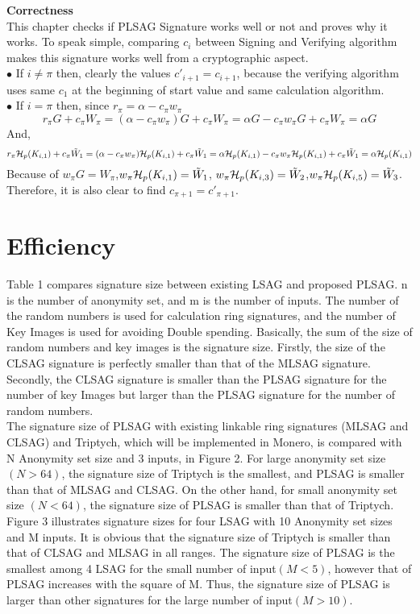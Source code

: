     \textbf{Correctness}\\
    This chapter checks if PLSAG Signature works well or not and proves why it works. To speak simple, comparing $c_{i}$ between Signing and Verifying algorithm makes this signature works well from a cryptographic aspect.\\
    $\bullet$ If $i\neq \pi $ then, clearly the values $c'_{i+1}=c_{i+1}$, 
    because the verifying algorithm uses same $c_{1}$ at the beginning of start value and same calculation algorithm.\\
    $\bullet$ If $i=\pi$ then, since $r_{\pi}=\alpha - c_{\pi}w_{\pi}$\\
    $$r_{\pi}G+c_{\pi}W_{\pi}=(\alpha - c_{\pi}w_{\pi})G+ c_{\pi}W_{\pi}=\alpha G - c_{\pi}w_{\pi}G + c_{\pi}W_{\pi}=\alpha G$$
    And,
    $$r_{\pi}{\cal H}_{p}(K_{i,1})+c_{\pi} \tilde{W}_{1}= (\alpha - c_{\pi}w_{\pi}){\cal H}_{p}(K_{i,1})+c_{\pi} \tilde{W}_{1}= \alpha {\cal H}_{p}(K_{i,1}) - c_{\pi}w_{\pi}{\cal H}_{p}(K_{i,1})+c_{\pi} \tilde{W}_{1}= \alpha {\cal H}_{p}(K_{i,1})$$
    Because of $w_{\pi}G=W_{\pi}$,$w_{\pi}{\cal H}_{p}(K_{i,1})=\tilde{W}_{1}$, $w_{\pi}{\cal H}_{p}(K_{i,3})=\tilde{W}_{2}$,$w_{\pi}{\cal H}_{p}(K_{i,5})=\tilde{W}_{3}$.\\
    Therefore, it is also clear to find $c_{\pi + 1}=c'_{\pi +1}$.

\section{Efficiency}

    Table 1 compares signature size between existing LSAG and proposed PLSAG. n is the number of anonymity set, and m is the number of inputs. The number of the random numbers is used for calculation ring signatures, and the number of Key Images is used for avoiding Double spending. Basically, the sum of the size of random numbers and key images is the signature size. Firstly, the size of the CLSAG signature is perfectly smaller than that of the MLSAG signature. Secondly, the CLSAG signature is smaller than the PLSAG signature for the number of key Images but larger than the PLSAG signature for the number of random numbers.\\ The signature size of PLSAG with existing linkable ring signatures (MLSAG and CLSAG) and Triptych, which will be implemented in Monero, is compared with N Anonymity set size and 3 inputs, in Figure 2. For large anonymity set size $(N>64)$, the signature size of Triptych is the smallest, and PLSAG is smaller than that of MLSAG and CLSAG. On the other hand, for small anonymity set size $(N<64)$, the signature size of PLSAG is smaller than that of Triptych.\\ Figure 3 illustrates signature sizes for four LSAG with 10 Anonymity set sizes and M inputs. It is obvious that the signature size of Triptych is smaller than that of CLSAG and MLSAG in all ranges. The signature size of PLSAG is the smallest among 4 LSAG for the small number of input$(M<5)$, however that of PLSAG increases with the square of M. Thus, the signature size of PLSAG is larger than other signatures for the large number of input$(M>10)$.
    
